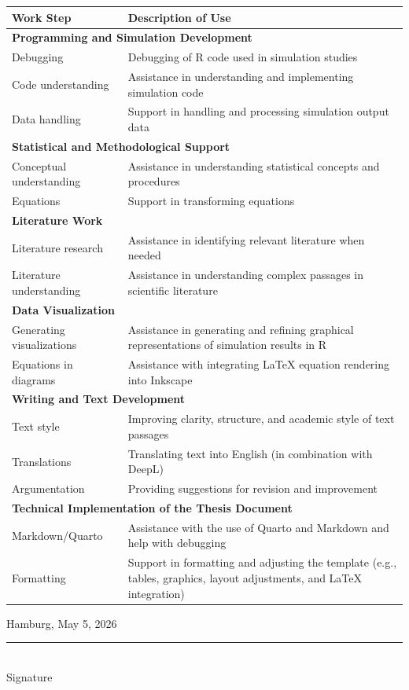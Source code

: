 \begin{tabularx}{\textwidth}{|p{4.5cm}|X|}
\hline
\textbf{Work Step} & \textbf{Description of Use} \\
\hline

\multicolumn{2}{|l|}{\textbf{Programming and Simulation Development}} \\
\hline
Debugging & Debugging of R code used in simulation studies \\
Code understanding & Assistance in understanding and implementing simulation code \\
Data handling & Support in handling and processing simulation output data \\
\hline

\multicolumn{2}{|l|}{\textbf{Statistical and Methodological Support}} \\
\hline
Conceptual understanding & Assistance in understanding statistical concepts and procedures \\
Equations & Support in transforming equations \\
\hline

\multicolumn{2}{|l|}{\textbf{Literature Work}} \\
\hline
Literature research & Assistance in identifying relevant literature when needed \\
Literature understanding & Assistance in understanding complex passages in scientific literature \\
\hline

\multicolumn{2}{|l|}{\textbf{Data Visualization}} \\
\hline
Generating visualizations & Assistance in generating and refining graphical representations of simulation results in R \\
Equations in diagrams & Assistance with integrating LaTeX equation rendering into Inkscape \\
\hline

\multicolumn{2}{|l|}{\textbf{Writing and Text Development}} \\
\hline
Text style & Improving clarity, structure, and academic style of text passages \\
Translations & Translating text into English (in combination with DeepL) \\
Argumentation & Providing suggestions for revision and improvement \\
\hline

\multicolumn{2}{|l|}{\textbf{Technical Implementation of the Thesis Document}} \\
\hline
Markdown/Quarto & Assistance with the use of Quarto and Markdown and help with debugging \\
Formatting & Support in formatting and adjusting the template (e.g., tables, graphics, layout adjustments, and LaTeX integration) \\
\hline
\end{tabularx}

\vspace{3cm}

\noindent
\begin{minipage}[t]{0.45\textwidth}
\raggedright
Hamburg, May 5, 2026
\end{minipage}
\hfill
\begin{minipage}[t]{0.45\textwidth}
\raggedleft
\rule{5cm}{0.4pt}\\
Signature
\end{minipage}
